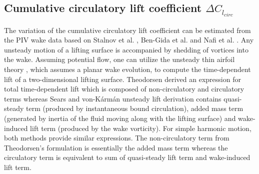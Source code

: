 \documentclass[12pt,a4paper]{article}
\begin{document}
\subsection{Cumulative circulatory lift coefficient $\Delta C_{l_{circ}}$}\label{dCl_calc}
The variation of the cumulative circulatory lift coefficient can be estimated from the PIV wake data based on Stalnov et al. \cite{Stalnov2015}, Ben-Gida et al. \cite{BenGida2016} and Nafi et al. \cite{Nafi2020}.
Any unsteady motion of a lifting surface is accompanied by shedding of vortices into the wake. Assuming potential flow, one can utilize the unsteady thin airfoil theory \cite{Theodorsen1935,Sears1938}, which assumes a planar wake evolution, to compute the time-dependent lift of a two-dimensional lifting surface.
Theodorsen \cite{Theodorsen1935} derived an expression for total time-dependent lift which is composed of non-circulatory and circulatory terms whereas Sears and von-K\'{a}rm\'{a}n \cite{Sears1938} unsteady lift derivation contains quasi-steady term (produced by instantaneous bound circulation), added mass term (generated by inertia of the fluid moving along with the lifting surface) and wake-induced lift term (produced by the wake vorticity). For simple harmonic motion, both methods provide similar expressions. 
The non-circulatory term from Theodorsen's \cite{Theodorsen1935} formulation is essentially the added mass term whereas the circulatory term is equivalent to sum of quasi-steady lift term and wake-induced lift term. 
\end{document}
